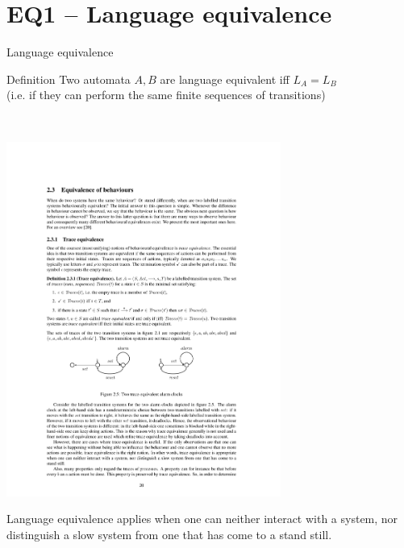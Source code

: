 \documentclass[aspectratio=169]{beamer}
\begin{document}

\section{EQ1 -- Language equivalence}

\begin{slide}{Language  equivalence}
\small

\begin{block}{Definition}
Two automata $A, B$ are \alert{language equivalent} iff  $ L_A =  L_B$\\
(i.e. if they can perform the same finite sequences of transitions)
\end{block}
~\\

\begin{example}
  \centering
  \includegraphics[width=9cm]{./images/alarm3.pdf}
\end{example}


\alert{Language equivalence} applies  when one can neither interact with a system, nor distinguish a slow system from one that has come to a stand still.
\end{slide}
\end{document}
